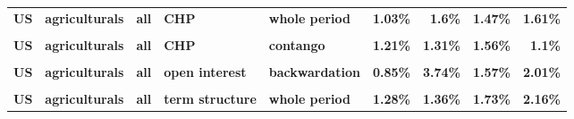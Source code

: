 \documentclass[
  authoryear,
  preprint,
  3p]{elsarticle}
\begin{document}
\begin{landscape}
\begin{longtable}[t]{>{}l>{}l>{}l>{}l>{}l>{}r>{}r>{}r>{}r}
\textbf{US} & \textbf{agriculturals} & \textbf{all} & \textbf{CHP} & \textbf{whole period} & \textcolor[HTML]{4285f4}{\textbf{1.03\%}} & \textcolor[HTML]{4285f4}{\textbf{1.6\%}} & \textcolor[HTML]{4285f4}{\textbf{1.47\%}} & \textcolor[HTML]{4285f4}{\textbf{1.61\%}}\\
\textbf{\cellcolor{gray!10}{US}} & \textbf{\cellcolor{gray!10}{agriculturals}} & \textbf{\cellcolor{gray!10}{all}} & \textbf{\cellcolor{gray!10}{CHP}} & \textbf{\cellcolor{gray!10}{backwardation}} & \textcolor[HTML]{4285f4}{\textbf{\cellcolor{gray!10}{1.14\%}}} & \textcolor[HTML]{4285f4}{\textbf{\cellcolor{gray!10}{2.47\%}}} & \textcolor[HTML]{4285f4}{\textbf{\cellcolor{gray!10}{1.72\%}}} & \textcolor[HTML]{4285f4}{\textbf{\cellcolor{gray!10}{3.11\%}}}\\
\textbf{US} & \textbf{agriculturals} & \textbf{all} & \textbf{CHP} & \textbf{contango} & \textcolor[HTML]{4285f4}{\textbf{1.21\%}} & \textcolor[HTML]{4285f4}{\textbf{1.31\%}} & \textcolor[HTML]{4285f4}{\textbf{1.56\%}} & \textcolor[HTML]{4285f4}{\textbf{1.1\%}}\\
\addlinespace
\textbf{\cellcolor{gray!10}{US}} & \textbf{\cellcolor{gray!10}{agriculturals}} & \textbf{\cellcolor{gray!10}{all}} & \textbf{\cellcolor{gray!10}{open interest}} & \textbf{\cellcolor{gray!10}{whole period}} & \textcolor[HTML]{4285f4}{\textbf{\cellcolor{gray!10}{1.09\%}}} & \textcolor[HTML]{4285f4}{\textbf{\cellcolor{gray!10}{1.9\%}}} & \textcolor[HTML]{4285f4}{\textbf{\cellcolor{gray!10}{0.45\%}}} & \textcolor[HTML]{4285f4}{\textbf{\cellcolor{gray!10}{1\%}}}\\
\textbf{US} & \textbf{agriculturals} & \textbf{all} & \textbf{open interest} & \textbf{backwardation} & \textcolor[HTML]{4285f4}{\textbf{0.85\%}} & \textcolor[HTML]{4285f4}{\textbf{3.74\%}} & \textcolor[HTML]{4285f4}{\textbf{1.57\%}} & \textcolor[HTML]{4285f4}{\textbf{2.01\%}}\\
\textbf{\cellcolor{gray!10}{US}} & \textbf{\cellcolor{gray!10}{agriculturals}} & \textbf{\cellcolor{gray!10}{all}} & \textbf{\cellcolor{gray!10}{open interest}} & \textbf{\cellcolor{gray!10}{contango}} & \textcolor[HTML]{4285f4}{\textbf{\cellcolor{gray!10}{1.58\%}}} & \textcolor[HTML]{4285f4}{\textbf{\cellcolor{gray!10}{0.97\%}}} & \textcolor[HTML]{4285f4}{\textbf{\cellcolor{gray!10}{0.58\%}}} & \textcolor[HTML]{4285f4}{\textbf{\cellcolor{gray!10}{0.67\%}}}\\
\textbf{US} & \textbf{agriculturals} & \textbf{all} & \textbf{term structure} & \textbf{whole period} & \textcolor[HTML]{4285f4}{\textbf{1.28\%}} & \textcolor[HTML]{4285f4}{\textbf{1.36\%}} & \textcolor[HTML]{4285f4}{\textbf{1.73\%}} & \textcolor[HTML]{4285f4}{\textbf{2.16\%}}\\

\end{longtable}
\end{landscape}
\end{document}
